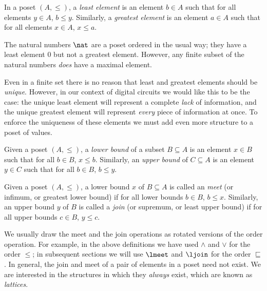 \begin{definition}
    In a poset \((A, \leq)\), a \emph{least element} is an element \(b \in A\)
    such that for all elements \(y \in A\), \(b \leq y\).
    Similarly, a \emph{greatest element} is an element \(a \in A\)
    such that for all elements \(x \in A\), \(x \leq a\).
\end{definition}

\begin{example}
    The natural numbers \(\nat\) are a poset ordered in the usual way; they have
    a least element \(0\) but not a greatest element.
    However, any finite subset of the natural numbers \emph{does} have a
    maximal element.
\end{example}

Even in a finite set there is no reason that least and greatest elements should
be \emph{unique}.
However, in our context of digital circuits we would like this to be the case:
the unique least element will represent a complete \emph{lack} of information,
and the unique greatest element will represent \emph{every} piece of information
at once.
To enforce the uniqueness of these elements we must add even more structure to
a poset of values.

\begin{definition}
    Given a poset \((A, \leq)\), a \emph{lower bound} of a subset
    \(B \subseteq A\) is an element \(x \in B\) such that for all \(b \in B\),
    \(x \leq b\).
    Similarly, an \emph{upper bound} of \(C \subseteq A\) is an element
    \(y \in C\) such that for all \(b \in B\), \(b \leq y\).
\end{definition}

\begin{definition}
    Given a poset \((A, \leq)\), a lower bound \(x\) of \(B \subseteq A\) is
    called an \emph{meet} (or infimum, or greatest lower bound) if for all lower
    bounds \(b \in B\), \(b \leq x\).
    Similarly, an upper bound \(y\) of \(B\) is called a \emph{join} (or
    supremum, or least upper bound) if for all upper bounds \(c \in B\),
    \(y \leq c\).
\end{definition}

We usually draw the meet and the join operations as rotated versions of the
order operation.
For example, in the above definitions we have used \(\wedge\) and \(\vee\) for
the order \(\leq\); in subsequent sections we will use \(\lmeet\) and
\(\ljoin\) for the order \(\sqsubseteq\).
In general, the join and meet of a pair of elements in a poset need not exist.
We are interested in the structures in which they \emph{always} exist, which are
known as \emph{lattices}.

